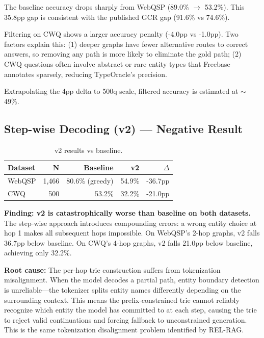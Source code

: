 \documentclass[11pt,twoside]{article}
\begin{document}
The baseline accuracy drops sharply from WebQSP (89.0\% \(\to\) 53.2\%). This
35.8pp gap is consistent with the published GCR gap (91.6\% vs 74.6\%).

Filtering on CWQ shows a larger accuracy penalty (-4.0pp vs -1.0pp). Two factors
explain this: (1) deeper graphs have fewer alternative routes to correct
answers, so removing any path is more likely to eliminate the gold path; (2)
CWQ questions often involve abstract or rare entity types that Freebase
annotates sparsely, reducing TypeOracle's precision.

Extrapolating the 4pp delta to 500q scale, filtered accuracy is estimated at
\(\sim\)49\%.

\subsection{Step-wise Decoding (v2) --- Negative Result}

\begin{table}[H]
  \centering
  \caption{v2 results vs baseline.}
  \label{tab:v2}
  \begin{tabular}{lrrrr}
    \toprule
    \textbf{Dataset} & \textbf{N} & \textbf{Baseline} & \textbf{v2} & \(\Delta\) \\
    \midrule
    WebQSP & 1,466 & 80.6\% (greedy) & 54.9\% & -36.7pp \\
    CWQ & 500 & 53.2\% & 32.2\% & -21.0pp \\
    \bottomrule
  \end{tabular}
\end{table}

\textbf{Finding: v2 is catastrophically worse than baseline on both datasets.}
The step-wise approach introduces compounding errors: a wrong entity choice at
hop 1 makes all subsequent hops impossible. On WebQSP's 2-hop graphs, v2 falls
36.7pp below baseline. On CWQ's 4-hop graphs, v2 falls 21.0pp below baseline,
achieving only 32.2\%.

\textbf{Root cause:} The per-hop trie construction suffers from tokenization
misalignment. When the model decodes a partial path, entity boundary detection
is unreliable---the tokenizer splits entity names differently depending on the
surrounding context. This means the prefix-constrained trie cannot reliably
recognize which entity the model has committed to at each step, causing the trie
to reject valid continuations and forcing fallback to unconstrained generation.
This is the same tokenization disalignment problem identified by REL-RAG.
\end{document}

